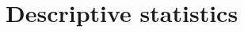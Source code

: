 \onlyinsubfile{\setcounter{section}{2}}
\section{Descriptive statistics}\notinsubfile{\label{sec:data}}
